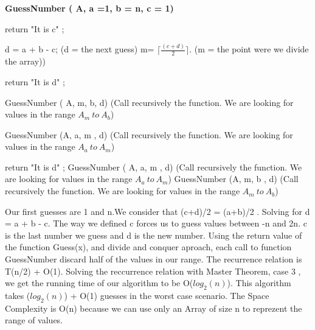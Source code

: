 \documentclass[11 pt]{article}
\begin{document}
\textbf{ GuessNumber ( A,  a =1,  b = n,  c = 1) }\\
\begin{algorithmic}
                     \State
                      return  "It is c" ;
                         \EndIf \newline
                         
                        \State d = a + b - c;       (d = the next guess)
                         \State m= $\lceil  \frac{ (c + d) }{2}  \rceil$.  (m =  the point were we divide the array))\newline
                      
                          \State  return  "It is d" ;
                       
                          \State GuessNumber ( A, m, b, d)  (Call recursively the function. We are looking for values in the range  $A_m \ to \ A_b $)
                        
                          \Else 
                          \State GuessNumber (A, a, m , d) (Call recursively the function. We are looking for values in the range  $A_a \ to \  A_m $)
                    
                            \EndIf
                            \EndIf
                           \newline
                            
                          \State  return  "It is d" ;
                          \State GuessNumber ( A, a,  m , d) (Call recursively the function. We are looking for values in the range  $A_a\ to \  A_m $)
                          \Else 
                          \State GuessNumber (A, m, b , d) (Call recursively the function. We are looking for values in the range  $A_m \ to \  A_b $)
                            \EndIf 
                         \EndIf
                         
                         \end {algorithmic}
                            
Our first guesses are 1 and n.We consider that  (c+d)/2 = (a+b)/2 . Solving for d =  a + b - c. The way we defined c forces us to guess values between -n and 2n. c is the last number we guess and d is the new number. Using the return value of the function Guess(x), and divide and conquer aproach,  each call to function GuessNumber discard half of the values in our range. The recurrence relation is T(n/2) + O(1).      
Solving the reccurrence relation with Master Theorem, case 3 , we get the running time of our algorithm to be O($log_2 (n)$). This algorithm takes ($log_2 (n)$) + O(1) guesses in the worst case scenario. The Space Complexity is O(n) because we can use only an Array of size n to reprezent the range of values. \\
\end{document}
